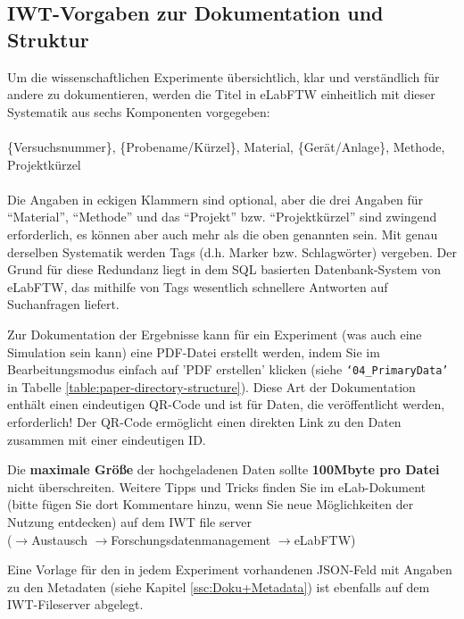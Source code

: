 \subsection{IWT-Vorgaben zur Dokumentation und Struktur}

Um die wissenschaftlichen Experimente übersichtlich, klar und verständlich für andere zu dokumentieren, werden die Titel in eLabFTW einheitlich mit dieser Systematik aus sechs Komponenten vorgegeben: \\
 \\
\{Versuchsnummer\}, \{Probename/Kürzel\}, Material, \{Gerät/Anlage\}, Methode, Projektkürzel \\
 \\
Die Angaben in eckigen Klammern sind optional, aber die drei Angaben für ``Material'', ``Methode'' und das ``Projekt'' bzw. ``Projektkürzel'' sind zwingend erforderlich, es können aber auch mehr als die oben genannten sein. Mit genau derselben Systematik werden Tags (d.h. Marker bzw. Schlagwörter) vergeben. Der Grund für diese Redundanz liegt in dem SQL basierten Datenbank-System von eLabFTW, das mithilfe von Tags wesentlich schnellere Antworten auf Suchanfragen liefert.

Zur Dokumentation der Ergebnisse kann für ein Experiment (was auch eine Simulation sein kann) eine PDF-Datei erstellt werden, indem Sie im Bearbeitungsmodus einfach auf 'PDF erstellen' klicken (siehe
\texttt{‘04\_PrimaryData’} in Tabelle \ref{table:paper-directory-structure}).
Diese Art der Dokumentation enthält einen eindeutigen QR-Code und ist für Daten, die veröffentlicht werden, erforderlich! Der QR-Code ermöglicht einen direkten Link zu den Daten zusammen mit einer eindeutigen ID.

Die \textbf{maximale Größe} der hochgeladenen Daten sollte \textbf{100Mbyte pro Datei} nicht überschreiten. Weitere Tipps und Tricks finden Sie im eLab-Dokument (bitte fügen Sie dort Kommentare hinzu, wenn Sie neue Möglichkeiten der Nutzung entdecken) auf dem IWT file server   \\ ($\rightarrow$Austausch $\rightarrow$Forschungsdatenmanagement $\rightarrow$eLabFTW)

Eine Vorlage für den in jedem Experiment vorhandenen JSON-Feld mit Angaben zu den Metadaten (siehe Kapitel \ref{ssc:Doku+Metadata}) ist ebenfalls auf dem IWT-Fileserver abgelegt.
